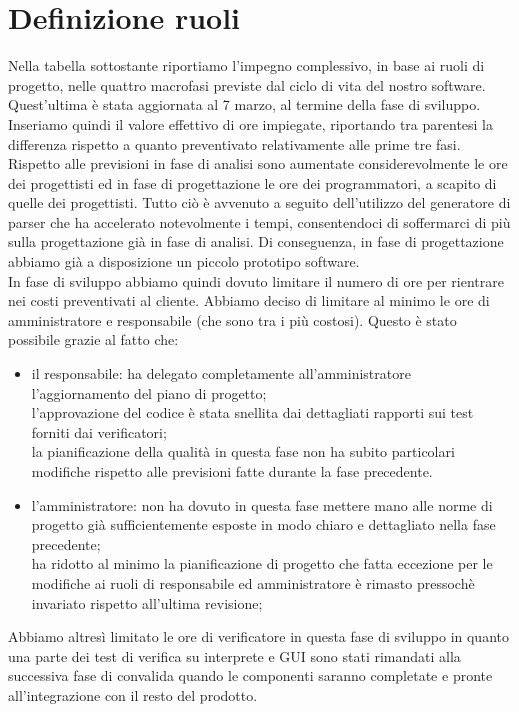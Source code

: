 \section{Definizione ruoli}
Nella tabella sottostante riportiamo l'impegno complessivo, in base ai ruoli di progetto, nelle quattro macrofasi previste dal ciclo di vita del nostro software. Quest'ultima
\`e stata aggiornata al 7 marzo, al termine della fase di sviluppo. Inseriamo quindi il valore effettivo di ore impiegate, riportando tra parentesi la differenza rispetto a quanto preventivato relativamente alle prime tre fasi. \\
Rispetto alle previsioni in fase di analisi sono aumentate considerevolmente 
le ore dei progettisti ed in fase di progettazione le ore 
dei programmatori, a scapito di quelle dei progettisti. Tutto ci\`o \`e avvenuto a seguito dell'utilizzo del generatore di parser che ha accelerato notevolmente i tempi, consentendoci di soffermarci di pi\`u sulla progettazione gi\`a in fase di analisi. Di conseguenza, in fase di progettazione abbiamo gi\`a a disposizione un piccolo prototipo software. 
\\In fase di sviluppo abbiamo quindi dovuto limitare il numero di ore per rientrare nei costi preventivati al cliente. Abbiamo deciso di limitare al minimo le ore di amministratore e responsabile (che sono tra i pi\`u costosi). Questo \`e stato possibile grazie al fatto che:
\begin{itemize}
\item il responsabile: ha delegato completamente all'amministratore l'aggiornamento del piano di progetto; 
\\l'approvazione del codice \`e stata snellita dai dettagliati rapporti sui test forniti dai verificatori; 
\\la pianificazione della qualit\`a in questa fase non ha subito particolari modifiche rispetto alle previsioni fatte durante la fase precedente.
\item l'amministratore: non ha dovuto in questa fase mettere mano alle norme di progetto gi\`a sufficientemente esposte in modo chiaro e dettagliato nella fase precedente; 
\\ha ridotto al minimo la pianificazione di progetto che fatta eccezione per le modifiche ai ruoli di responsabile ed amministratore \`e rimasto pressoch\`e invariato rispetto all'ultima revisione;
\end{itemize}
Abbiamo altres\`i limitato le ore di verificatore in questa fase di sviluppo in quanto una parte dei test di verifica su interprete e GUI sono stati rimandati alla successiva fase di convalida quando le componenti saranno completate e pronte all'integrazione con il resto del prodotto.

